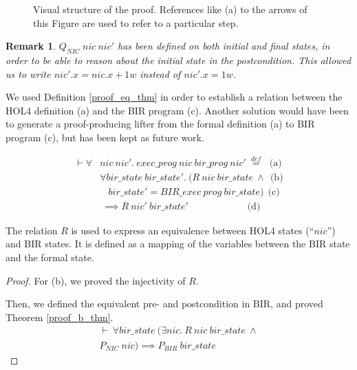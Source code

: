 \documentclass[10pt,a4paper]{article}
\newcommand{\eqdef}{\stackrel{def}{=}}
\newtheorem{remark}{Remark}
\begin{document}
\begin{multicols}{2}
\begin{figure}[H]
	\centering
	\caption{Visual structure of the proof. References like (a) to the arrows of this Figure are used to refer to a particular step.}
	\label{proof_schema}
\end{figure}
%
\begin{remark} \label{remark_Q_nic_intial_final}
$Q_{NIC}~nic~nic'$ has been defined on both initial and final states, in order to be able to reason about the initial state in the postcondition. This allowed us to write $nic'.x = nic.x + 1w$ instead of $nic'.x = 1w$.
\end{remark}
%
\par We used Definition \ref{proof_eq_thm} in order to establish a relation between the HOL4 definition (a) and the BIR program (c). Another solution would have been to generate a proof-producing lifter from the formal definition (a) to BIR program (c), but has been kept as future work.
%
\begin{small}
  \begin{equation}
  \begin{split}
    \vdash \forall &nic~nic'.~exec\_prog~nic~bir\_prog~nic'~\eqdef ~~\, \text{(a)}\\
      &\forall bir\_state~bir\_state'.~(R~nic~bir\_state~\land ~~ \text{(b)}\\
            &~~~~bir\_state' = BIR\_exec~prog~bir\_state) ~~ \text{(c)}\\
            &~\implies R~nic'~bir\_state' ~~~~~~~~~~~~~~~~~~~~~~~~~~~\, \text{(d)}
  \end{split}
  \label{proof_eq_thm}
  \end{equation}
\end{small}
%
\par The relation $R$ is used to express an equivalence between HOL4 states (``$nic$'') and BIR states. It is defined as a mapping of the variables between the BIR state and the formal state.

\begin{proof}

For (b), we proved the injectivity of $R$.

Then, we defined the equivalent pre- and postcondition in BIR, and proved Theorem \ref{proof_b_thm}.
%
\begin{equation} \label{proof_b_thm}
  \begin{split}
  \vdash~\forall bir\_state~(\exists nic.~R~nic~bir\_state~\land\\
  P_{NIC}~nic) \implies P_{BIR}~bir\_state
  \end{split}
\end{equation}
%

\end{proof}
\end{multicols}
\end{document}
